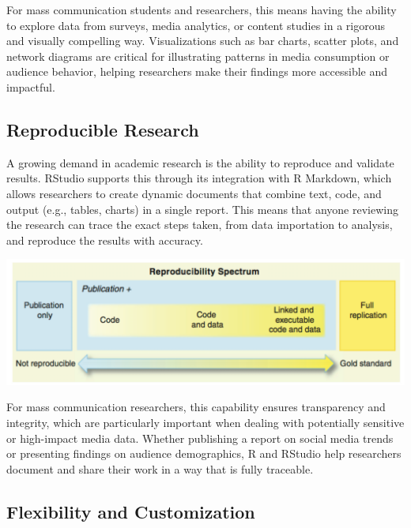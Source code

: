 \documentclass[
]{book}
\begin{document}
For mass communication students and researchers, this means having the ability to explore data from surveys, media analytics, or content studies in a rigorous and visually compelling way. Visualizations such as bar charts, scatter plots, and network diagrams are critical for illustrating patterns in media consumption or audience behavior, helping researchers make their findings more accessible and impactful.

\subsection*{Reproducible Research}\label{reproducible-research}

A growing demand in academic research is the ability to reproduce and validate results. RStudio supports this through its integration with R Markdown, which allows researchers to create dynamic documents that combine text, code, and output (e.g., tables, charts) in a single report. This means that anyone reviewing the research can trace the exact steps taken, from data importation to analysis, and reproduce the results with accuracy.

\href{https://geohackweek.github.io/reproducible-research/01-reproducible/}{\includegraphics[width=1\textwidth,height=\textheight]{images/reproducibility.png}}

For mass communication researchers, this capability ensures transparency and integrity, which are particularly important when dealing with potentially sensitive or high-impact media data. Whether publishing a report on social media trends or presenting findings on audience demographics, R and RStudio help researchers document and share their work in a way that is fully traceable.

\subsection*{Flexibility and Customization}\label{flexibility-and-customization}
\end{document}
